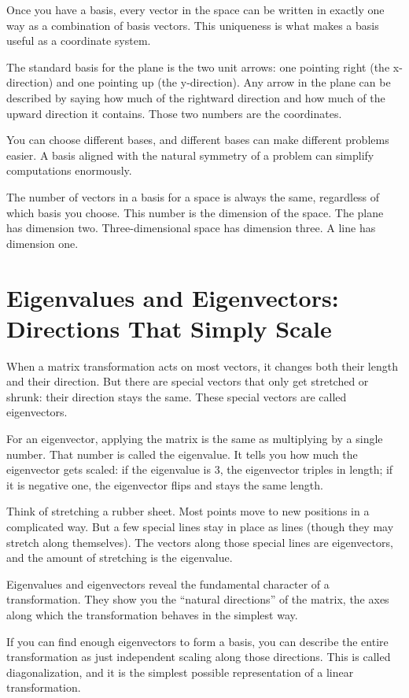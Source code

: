 \documentclass[11pt]{article}
\begin{document}
Once you have a basis, every vector in the space can be written in exactly one way as a combination of basis vectors. This uniqueness is what makes a basis useful as a coordinate system.

The standard basis for the plane is the two unit arrows: one pointing right (the x-direction) and one pointing up (the y-direction). Any arrow in the plane can be described by saying how much of the rightward direction and how much of the upward direction it contains. Those two numbers are the coordinates.

You can choose different bases, and different bases can make different problems easier. A basis aligned with the natural symmetry of a problem can simplify computations enormously.

The number of vectors in a basis for a space is always the same, regardless of which basis you choose. This number is the dimension of the space. The plane has dimension two. Three-dimensional space has dimension three. A line has dimension one.

\section*{Eigenvalues and Eigenvectors: Directions That Simply Scale}

When a matrix transformation acts on most vectors, it changes both their length and their direction. But there are special vectors that only get stretched or shrunk: their direction stays the same. These special vectors are called eigenvectors.

For an eigenvector, applying the matrix is the same as multiplying by a single number. That number is called the eigenvalue. It tells you how much the eigenvector gets scaled: if the eigenvalue is 3, the eigenvector triples in length; if it is negative one, the eigenvector flips and stays the same length.

Think of stretching a rubber sheet. Most points move to new positions in a complicated way. But a few special lines stay in place as lines (though they may stretch along themselves). The vectors along those special lines are eigenvectors, and the amount of stretching is the eigenvalue.

Eigenvalues and eigenvectors reveal the fundamental character of a transformation. They show you the ``natural directions'' of the matrix, the axes along which the transformation behaves in the simplest way.

If you can find enough eigenvectors to form a basis, you can describe the entire transformation as just independent scaling along those directions. This is called diagonalization, and it is the simplest possible representation of a linear transformation.
\end{document}
